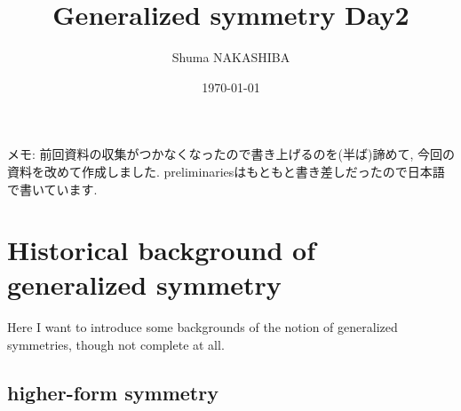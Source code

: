 \documentclass{ltjsarticle}
\title{Generalized symmetry Day2}
\author{Shuma NAKASHIBA}
\date{\today}
\theoremstyle{mystyle} %
\numberwithin{equation}{section}
\begin{document}
\maketitle
\noindent
\small
メモ: 前回資料の収集がつかなくなったので書き上げるのを(半ば)諦めて, 今回の資料を改めて作成しました. 
preliminariesはもともと書き差しだったので日本語で書いています. 
\normalsize
\setcounter{tocdepth}{2}
\tableofcontents
\newpage
\section{Historical background of generalized symmetry}
Here I want to introduce some backgrounds of the notion of generalized symmetries, though not complete at all. 
\subsection{higher-form symmetry}
\end{document}
